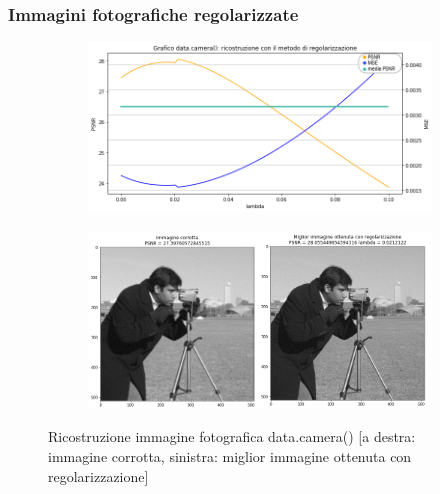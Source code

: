 {\color{ggreen}\subsubsection{Immagini fotografiche regolarizzate}}
\begin{figure}[H]
    \centering
    \begin{subfigure}{0.5\textwidth}
        \includegraphics[width=\textwidth]{imgRicostruzione/graficoCameraman_minimize.png}
    \end{subfigure}%
    \begin{subfigure}{0.5\textwidth}
        \centering
        \includegraphics[width=\textwidth]{imgRicostruzione/ricostruzioneCameraman_minimize.png}
    \end{subfigure}
    \caption{Ricostruzione immagine fotografica data.camera() [a destra: immagine corrotta, sinistra: miglior immagine ottenuta con regolarizzazione]}
    

\end{figure}
